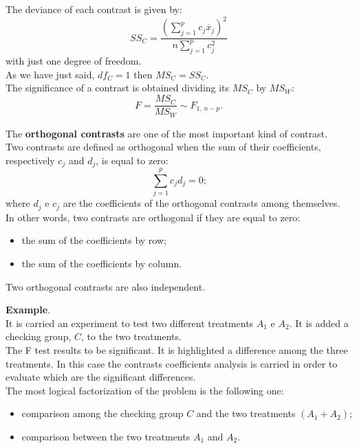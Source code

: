 \begin{frame}
  \vspace{.50cm}
  The deviance of each contrast is given by:
  $$ SS_C = \frac{(\sum_{j=1}^p{c_j\overline{x}_j})^2}{n\sum_{j=1}^p{c_j^2}} $$
  with just one degree of freedom.\\
  \vspace*{.25cm}
  As we have just said, $ df_C = 1 $ then $ MS_C = SS_C $.\\
  \vspace*{.50cm}
  The significance of a contrast is obtained dividing its $MS_C$ by $MS_W$:
  $$ F = \frac{MS_C}{MS_W}\sim F_{1,\,n-p} \mbox{.} $$
\end{frame}

\begin{frame}
  The \textbf{orthogonal contrasts} are one of the most important kind of contrast.\\
  Two contrasts are defined as orthogonal when the sum of their coefficients, respectively $c_j$ and $d_j$, is equal to zero:
  $$ \sum_{j=1}^p{c_jd_j} = 0 \mbox{;} $$
  where $ d_j $ e $ c_j $ are the coefficients of the orthogonal contrasts among themselves.\\ 
  \vspace{0.25cm}
  In other words, two contrasts are orthogonal if they are equal to zero:
  \begin{itemize}
    \item the sum of the coefficients by row;
    \item the sum of the coefficients by column.\\
  \end{itemize}
  \vspace{0.5cm}
  Two orthogonal contrasts are also independent.
\end{frame}

\begin{frame}
  \vspace{.5cm}
  \textbf{Example}.\\
  \vspace*{.5cm}
  It is carried an experiment to test two different treatments $A_1$ e $A_2$. It is added a checking group, $C$, to the two treatments.\\
  \vspace*{.5cm}
  The F test results to be significant. It is highlighted a difference among the three treatments. In this case the contrasts coefficients analysis is carried in order to evaluate which are the significant differences.\\
  \vspace*{.5cm}
  The most logical factorization of the problem is the following one:
  \begin{itemize}
    \item comparison among the checking group $ C $ and the two treatments $ (A_1+A_2) $;
    \item comparison between the two treatments $ A_1 $ and $ A_2 $.
  \end{itemize}
\end{frame}

